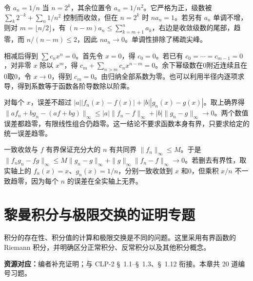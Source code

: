\documentclass[12pt,fontset=fandol]{ctexart}
\begin{document}
\begin{solve}\label{ans:c29q17}
令 $a_n=1/n$ 当 $n=2^k$，其余位置令 $a_n=1/n^2$。它严格为正，级数被 $\sum_k2^{-k}+\sum_n1/n^2$ 控制而收敛，但在 $n=2^k$ 时 $na_n=1$。若另有 $a_n$ 单调不增，则对 $m=\lfloor n/2\rfloor$，有 $(n-m)a_n\le\sum_{k=m+1}^na_k$，右边是收敛级数的尾部，趋零，而 $n/(n-m)\le2$，因此 $na_n\to0$。单调性排除了稀疏尖峰。
\end{solve}

\begin{solve}\label{ans:c29q18}
相减后得到 $\sum c_nx^n=0$。首先令 $x=0$，得 $c_0=0$。若已有 $c_0=\cdots=c_{m-1}=0$，对非零 $x$ 除以 $x^m$，得 $c_m+\sum_{n>m}c_nx^{n-m}=0$。余下幂级数在0附近连续且在0取0，令 $x\to0$，得到 $c_m=0$。由归纳全部系数为零。也可以利用半径内逐项求导，得到系数等于函数各阶导数除以阶乘。
\end{solve}

\begin{solve}\label{ans:c29q19}
对每个 $x$，误差不超过 $|a||f_n(x)-f(x)|+|b||g_n(x)-g(x)|$。取上确界得 $\|af_n+bg_n-(af+bg)\|_\infty\le|a|\|f_n-f\|_\infty+|b|\|g_n-g\|_\infty\to0$。两个数值误差都趋零，有限线性组合仍趋零。这一结论不要求函数本身有界，只要求给定的统一误差趋零。
\end{solve}

\begin{solve}\label{ans:c29q20}
一致收敛与 $f$ 有界保证充分大的 $n$ 有共同界 $\|f_n\|_\infty\le M$。于是 $\|f_ng_n-fg\|_\infty\le M\|g_n-g\|_\infty+\|g\|_\infty\|f_n-f\|_\infty\to0$。若删去有界性，取实轴上的 $f_n(x)=x$、$g_n(x)=1/n$，分别一致收敛到 $x$ 和0，但乘积 $x/n$ 不一致趋零，因为每个 $n$ 的误差在全实轴上无界。
\end{solve}

\clearpage
\section{黎曼积分与极限交换的证明专题}\label{sec:ch30}
积分的存在性、积分值的计算和极限交换是不同的问题。这里采用有界函数的 Riemann 积分，并明确区分正常积分、反常积分以及其他积分概念。

\textbf{资源对应：}编者补充证明；与 CLP-2 \S~1.1--\S~1.3、\S~1.12 衔接。本章共 20 道编号习题。
\end{document}
